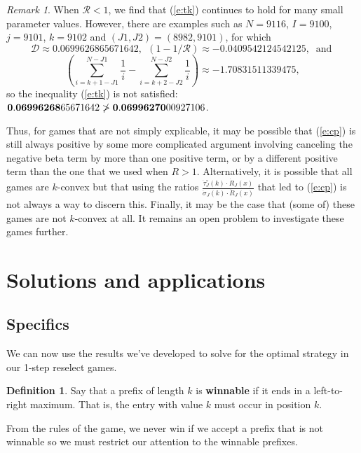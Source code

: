 \documentclass[11pt]{amsart}   %
\theoremstyle{definition}
\newtheorem{definition}[theorem]{Definition}
\theoremstyle{remark}
\newtheorem{remark}[theorem]{Remark}
\numberwithin{equation}{section}
\theoremstyle{theorem}
\begin{document}
\begin{remark}
When $\mathcal{R} < 1$, we find that (\ref{e:tk}) continues to hold for many small parameter values.  However, there are examples such as $N = 9116$, $I = 9100$, $j = 9101$, $k = 9102$ and $(J1, J2) = (8982, 9101)$, for which
    \[ \mathcal{D} \approx  0.0699626865671642, \ \  (1 - 1/\mathcal{R}) \approx -0.0409542124542125, \ \text{ and } \]
    \[ \left( \sum_{i=k+1-J1}^{N-J1} \frac{1}{i} - \sum_{i=k+2-J2}^{N-J2} \frac{1}{i} \right) \approx -1.70831511339475, \]
so the inequality (\ref{e:tk}) is not satisfied:  ${\bf 0.06996268}65671642 \not > {\bf 0.06996270}00927106$.

Thus, for games that are not simply explicable, it may be possible that (\ref{e:cp}) is still always positive by some more complicated argument involving canceling the negative beta term by more than one positive term, or by a different positive term than the one that we used when $R > 1$.  Alternatively, it is possible that all games are $k$-convex but that using the ratios $\frac{\dot\tau^\circ_J(k) \cdot \dot{R}_J(x)}{\dot\sigma_J(k) \cdot \dot{R}_J(x)}$ that led to (\ref{e:cp}) is not always a way to discern this.  Finally, it may be the case that (some of) these games are not $k$-convex at all.  It remains an open problem to investigate these games further.
\end{remark}


\bigskip
\section{Solutions and applications}\label{s:6}

\subsection{Specifics}\label{s:themain}
We can now use the results we've developed to solve for the optimal strategy in our 1-step reselect games.

\begin{definition}
Say that a prefix of length $k$ is {\bf winnable} if it ends in a left-to-right maximum.  That is, the entry with value $k$ must occur in position $k$.
\end{definition}

From the rules of the game, we never win if we accept a prefix that is not winnable so we must restrict our attention to the winnable prefixes.
\end{document}
